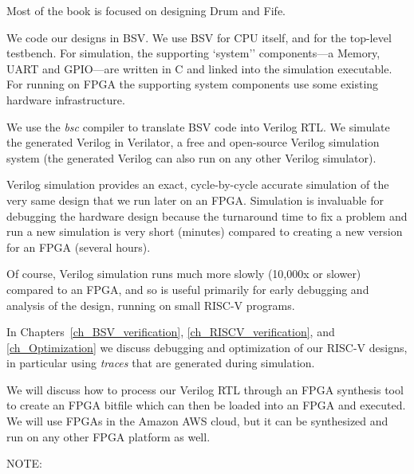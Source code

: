 \vspace{1ex}


Most of the book is focused on designing Drum and Fife.

We code our designs in BSV.  We use BSV for CPU itself, and for the
top-level testbench.  For simulation, the supporting `system''
components---a Memory, UART and GPIO---are written in C and linked
into the simulation executable.  For running on FPGA the supporting
system components use some existing hardware infrastructure.

We use the \emph{bsc} compiler to translate BSV code into Verilog RTL.
We simulate the generated Verilog in Verilator, a free and open-source
Verilog simulation system (the generated Verilog can also run on any
other Verilog simulator).

Verilog simulation provides an exact, cycle-by-cycle accurate
simulation of the very same design that we run later on an FPGA.
Simulation is invaluable for debugging the hardware design because the
turnaround time to fix a problem and run a new simulation is very
short (minutes) compared to creating a new version for an FPGA
(several hours).

Of course, Verilog simulation runs much more slowly (10,000x or
slower) compared to an FPGA, and so is useful primarily for early
debugging and analysis of the design, running on small RISC-V
programs.

In Chapters~\ref{ch_BSV_verification}, \ref{ch_RISCV_verification},
and \ref{ch_Optimization} we discuss debugging and optimization of our
RISC-V designs, in particular using \emph{traces} that are generated
during simulation.

We will discuss how to process our Verilog RTL through an FPGA
synthesis tool to create an FPGA bitfile which can then be loaded into
an FPGA and executed.  We will use FPGAs in the Amazon AWS cloud, but
it can be synthesized and run on any other FPGA platform as well.


\vspace{1ex}

NOTE: 


